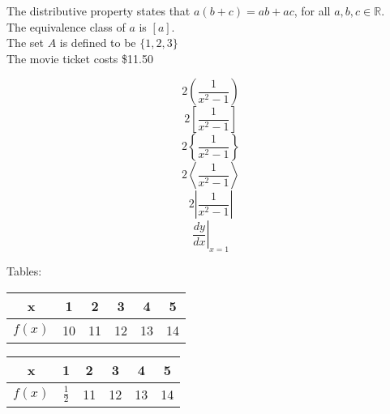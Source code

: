 \documentclass[11pt]{article}
\begin{document}
The distributive property states that $a(b+c)=ab+ac$, for all $a,b,c \in 
\mathbb{R}$.\\[6pt]
The equivalence class of $a$ is $[a]$.\\[6pt]
The set $A$ is defined to be $\{1,2,3\}$\\[6pt]
The movie ticket costs \$11.50

$$2\left(\frac{1}{x^2-1}\right)$$
$$2\left[\frac{1}{x^2-1}\right]$$
$$2\left\{\frac{1}{x^2-1}\right\}$$
$$2\left\langle\frac{1}{x^2-1}\right\rangle$$
$$2\left | \frac{1}{x^2-1}\right |$$
$$\left.\frac{dy}{dx}\right|_{x=1}$$

Tables:\\[6pt]
\begin{tabular}{|c||c|c|c|c|c|}
\hline
x & 1 & 2 & 3 & 4 & 5 \\ \hline
$f(x)$ & 10 & 11 & 12 & 13 & 14 \\ \hline

\end{tabular}

\vspace{1cm}
\begin{table}[H]
\begin{tabular}{|c||c|c|c|c|c|}
\hline
x & 1 & 2 & 3 & 4 & 5 \\ \hline
$f(x)$ & $\frac{1}{2}$ & 11 & 12 & 13 & 14 \\ \hline

\end{tabular}
\end{table}
\end{document}
